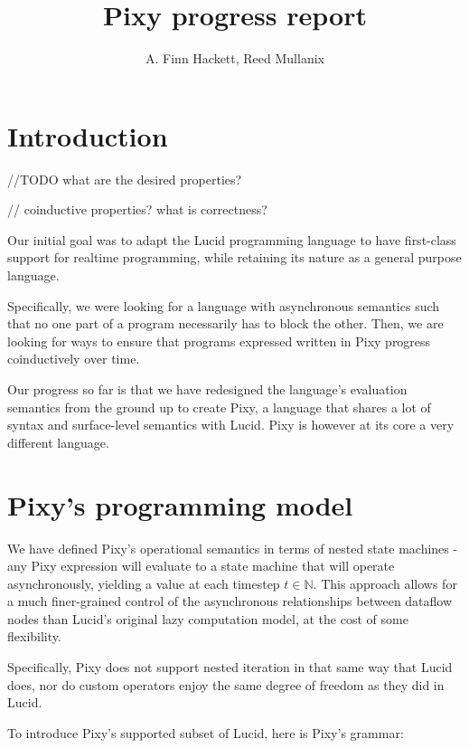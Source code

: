 \documentclass{scrartcl}
\begin{document}
    \title{Pixy progress report}
    \author{A. Finn Hackett, Reed Mullanix}
    
    \maketitle
    
    \tableofcontents
    
    \section{Introduction}
    
    //TODO what are the desired properties?
    
    // coinductive properties? what is correctness?
    
    Our initial goal was to adapt the Lucid programming language to have first-class support for realtime programming, while retaining its nature as a general purpose language.
    
    Specifically, we were looking for a language with asynchronous semantics such that no one part of a program necessarily has to block the other. Then, we are looking for ways to ensure that programs expressed written in Pixy progress coinductively over time.
    
    Our progress so far is that we have redesigned the language's evaluation semantics from the ground up to create Pixy, a language that shares a lot of syntax and surface-level semantics with Lucid. Pixy is however at its core a very different language.
    
    \section{Pixy's programming model}
    
    We have defined Pixy's operational semantics in terms of nested state machines - any Pixy expression will evaluate to a state machine that will operate asynchronously, yielding a value at each timestep $t \in \mathbb{N}$.
    This approach allows for a much finer-grained control of the asynchronous relationships between dataflow nodes than Lucid's original lazy computation model, at the cost of some flexibility.
    
    Specifically, Pixy does not support nested iteration in that same way that Lucid does, nor do custom operators enjoy the same degree of freedom as they did in Lucid.
    
    To introduce Pixy's supported subset of Lucid, here is Pixy's grammar:
    
\end{document}
